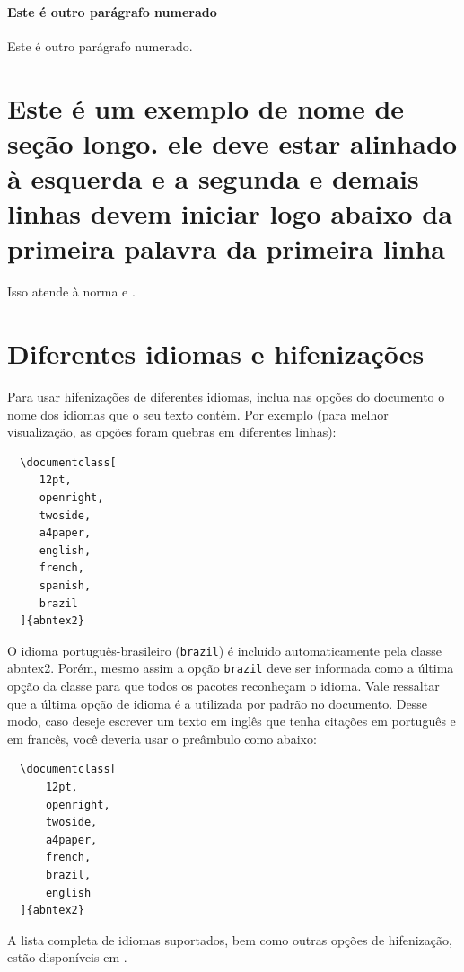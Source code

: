 \documentclass[article,12pt,oneside,a4paper,chapter=TITLE,english,brazil]{abntex2}
\begin{document}
\begin{anexosenv}
\paragraph{Este é outro parágrafo numerado}\label{sec-exemplo-paragrafo-outro}

Este é outro parágrafo numerado.

\section{Este é um exemplo de nome de seção longo. ele deve estar alinhado à esquerda e a segunda e demais linhas devem iniciar logo abaixo da primeira palavra da primeira linha}

Isso atende à norma  e .

\section{Diferentes idiomas e hifenizações}
\label{sec-hifenizacao}

Para usar hifenizações de diferentes idiomas, inclua nas opções do documento o nome dos idiomas que o seu texto contém. Por exemplo (para melhor visualização, as opções foram quebras em diferentes linhas):
\begin{verbatim}
  \documentclass[
     12pt,
     openright,
     twoside,
     a4paper,
     english,
     french,
     spanish,
     brazil
  ]{abntex2}
\end{verbatim}

O idioma português-brasileiro (\texttt{brazil}) é incluído automaticamente pela classe \textsf{abntex2}. Porém, mesmo assim a opção \texttt{brazil} deve ser informada como a última opção da classe para que todos os pacotes reconheçam o idioma. Vale ressaltar que a última opção de idioma é a utilizada por padrão no documento. Desse modo, caso deseje escrever um texto em inglês que tenha citações em português e em francês, você deveria usar o preâmbulo como abaixo:
\begin{verbatim}
  \documentclass[
      12pt,
      openright,
      twoside,
      a4paper,
      french,
      brazil,
      english
  ]{abntex2}
\end{verbatim}

A lista completa de idiomas suportados, bem como outras opções de hifenização, estão disponíveis em .


\end{anexosenv}
\end{document}

